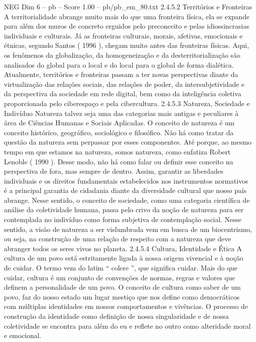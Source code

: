 \begin{textsample}{NEG Dim 6 – pb – Score 1.00 – pb/pb\_em\_80.txt}  \label{ex:f6_neg_088}
2.4.5.2 Territórios e Fronteiras A territorialidade abrange muito mais do que uma fronteira física, ela se expande para além dos muros de concreto erguidos pelo preconceito e pelas idiossincrasias individuais e culturais.
Já as fronteiras culturais, morais, afetivas, emocionais e étnicas, segundo Santos ( 1996 ), chegam muito antes das fronteiras físicas.
Aqui, os fenômenos da globalização, da homogeneização e da desterritorialização são analisados do global para o local e do local para o global de forma dialética.
Atualmente, territórios e fronteiras passam a ter novas perspectivas diante da virtualização das relações sociais, das relações de poder, da intersubjetividade e da perspectiva da sociedade em rede digital, bem como da inteligência coletiva proporcionada pelo ciberespaço e pela cibercultura. 2.4.5.3 Natureza, Sociedade e Indivíduo Natureza talvez seja uma das categorias mais antigas e peculiares à área de Ciências Humanas e Sociais Aplicadas.
O conceito de natureza é um conceito histórico, geográfico, sociológico e filosófico.
Não há como tratar da questão da natureza sem perpassar por esses componentes.
Até porque, ao mesmo tempo em que estamos na natureza, somos natureza, como enfatiza Robert Lenoble ( 1990 ).
Desse modo, não há como falar ou definir esse conceito na perspectiva de fora, mas sempre de dentro.
Assim, garantir as liberdades individuais e os direitos fundamentais estabelecidos nos instrumentos normativos é a principal garantia de cidadania diante da diversidade cultural que nosso país abrange.
Nesse sentido, o conceito de sociedade, como uma categoria científica de análise da coletividade humana, passa pelo crivo da noção de natureza para ser contemplada no indivíduo como forma subjetiva de contemplação social.
Nesse sentido, a visão de natureza a ser vislumbrada vem em busca de um biocentrismo, ou seja, na construção de uma relação de respeito com a natureza que deve abranger todos os seres vivos no planeta. 2.4.5.4 Cultura, Identidade e Ética A cultura de um povo está estritamente ligada à nossa origem vivencial e à noção de cuidar.
O termo vem do latim “ colere ”, que significa cuidar.
Mais do que cuidar, cultura é um conjunto de convenções de normas, regras e valores que definem a personalidade de um povo.
O conceito de cultura como saber de um povo, faz do nosso estado um lugar mestiço que nos define como democráticos com múltiplas identidades em nossos comportamentos e vivências.
O processo de construção da identidade como definição de nossa singularidade e de nossa coletividade se encontra para além do eu e reflete no outro como alteridade moral e emocional.

\end{textsample}
